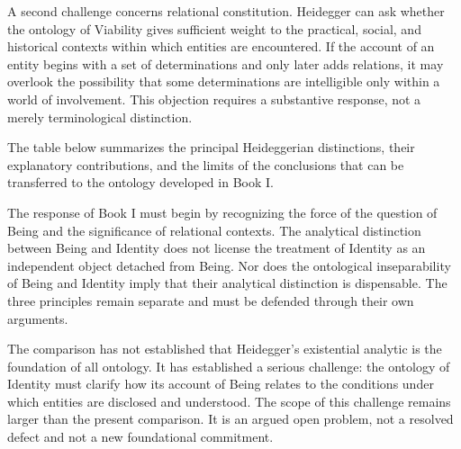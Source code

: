 A second challenge concerns relational
constitution. Heidegger can ask whether
the ontology of Viability gives sufficient
weight to the practical, social, and
historical contexts within which entities
are encountered. If the account of an
entity begins with a set of determinations
and only later adds relations, it may
overlook the possibility that some
determinations are intelligible only
within a world of involvement. This
objection requires a substantive response,
not a merely terminological distinction.

\label{para:VS.B01.P01.C08.S11.SS14.P003}

The table below summarizes the principal
Heideggerian distinctions, their explanatory
contributions, and the limits of the
conclusions that can be transferred to
the ontology developed in Book I.



\label{para:VS.B01.P01.C08.S11.SS14.P004}

The response of Book I must begin by
recognizing the force of the question
of Being and the significance of
relational contexts. The analytical
distinction between Being and Identity
does not license the treatment of
Identity as an independent object
detached from Being. Nor does the
ontological inseparability of Being
and Identity imply that their
analytical distinction is dispensable.
The three principles remain separate
and must be defended through their
own arguments.

\label{para:VS.B01.P01.C08.S11.SS14.P005}

The comparison has not established
that Heidegger's existential analytic
is the foundation of all ontology.
It has established a serious challenge:
the ontology of Identity must clarify
how its account of Being relates to
the conditions under which entities
are disclosed and understood. The
scope of this challenge remains
larger than the present comparison.
It is an argued open problem, not
a resolved defect and not a new
foundational commitment.



